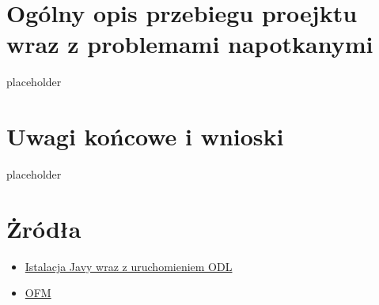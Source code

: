 \documentclass[12pt,a4paper,twoside]{article}
\begin{document}
\section{Ogólny opis przebiegu proejktu wraz z problemami napotkanymi}
placeholder
\section{Uwagi końcowe i wnioski}
placeholder
\newpage

\section*{Żródła}

\begin{itemize}
	\item \href{https://john.soban.ski/install-opendaylight-ubuntu-lts-fast.html}{Istalacja Javy wraz z uruchomieniem ODL}
	\item \href{https://github.com/CiscoDevNet/OpenDaylight-Openflow-App}{OFM}
\end{itemize}
\end{document}
